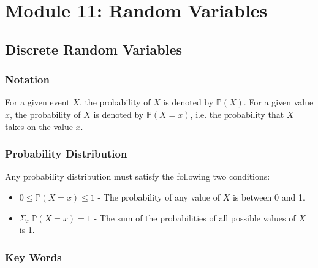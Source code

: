 \documentclass[12pt letter]{report}
\begin{document}
\chapter{Module 11: Random Variables}




\section{Discrete Random Variables}

\subsection{Notation}

For a given event $X$, the probability of $X$ is denoted by $\mathbb{P} \left( X \right) $. For a given value $x$, the
probability of $X$ is denoted by $\mathbb{P} \left( X = x \right) $, i.e. the probability that $X$ takes on the value $x$.

\subsection{Probability Distribution}


Any probability distribution must satisfy the following two conditions:

\begin{itemize}
  \item $0 \leq \mathbb{P} \left( X = x  \right) \leq 1 $ - The probability of any value of $X$ is between 0 and 1.
  \item $\Sigma_x \,  \mathbb{P} \left( X = x \right) = 1 $ - The sum of the probabilities of all possible values of $X$ is 1.
\end{itemize}

\subsection{Key Words}
\end{document}
